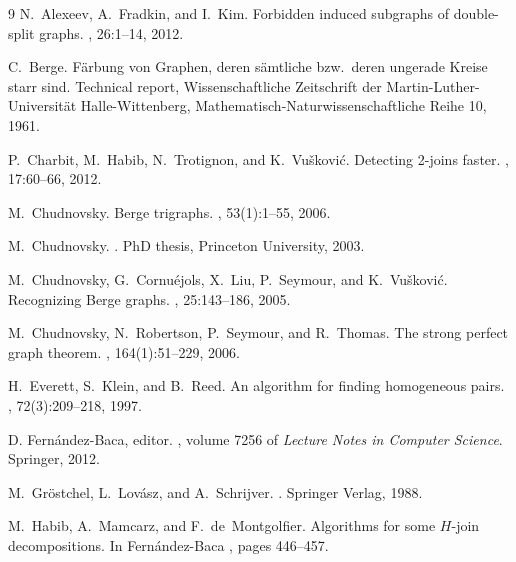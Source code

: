 \documentclass[11 pt] {article}
\begin{document}
\begin {thebibliography}{9}
N.~Alexeev, A.~Fradkin, and I.~Kim.
\newblock Forbidden induced subgraphs of double-split graphs.
, 26:1--14, 2012.


C.~Berge.
\newblock F{\"a}rbung von {G}raphen, deren s{\"a}mtliche bzw.~deren ungerade
  {K}reise starr sind.
\newblock Technical report, Wissenschaftliche Zeitschrift der
  Martin-Luther-Universit{\"a}t Halle-Wittenberg,
  Mathematisch-Naturwissenschaftliche Reihe 10, 1961.

P.~Charbit, M.~Habib, N.~Trotignon, and K.~Vu{\v s}kovi{\'c}.
\newblock Detecting 2-joins faster.
, 17:60--66, 2012.


M.~Chudnovsky.
\newblock Berge trigraphs.
, 53(1):1--55, 2006.


 M.~Chudnovsky.
.
\newblock PhD thesis, Princeton University, 2003.

M.~Chudnovsky, G.~Cornu{\'e}jols, X.~Liu, P.~Seymour, and K.~Vu{\v s}kovi{\'c}.
\newblock Recognizing {B}erge graphs.
, 25:143--186, 2005.
 
 M.~Chudnovsky, N.~Robertson, P.~Seymour, and R.~Thomas.
\newblock The strong perfect graph theorem.
, 164(1):51--229, 2006.

H.~Everett, S.~Klein, and B.~Reed.
\newblock An algorithm for finding homogeneous pairs.
, 72(3):209--218, 1997.

D. Fern{\'a}ndez-Baca, editor.
, volume 7256 of
  {\em Lecture Notes in Computer Science}. Springer, 2012.


M.~Gr{\"o}stchel, L.~Lov{\'a}sz, and A.~Schrijver.
.
\newblock Springer Verlag, 1988.


M.~Habib, A.~Mamcarz, and F.~de~Montgolfier.
\newblock Algorithms for some $H$-join decompositions.
\newblock In Fern{\'a}ndez-Baca \cite{DBLP:conf/latin/2012}, pages 446--457.



\end{thebibliography}
\end{document}
